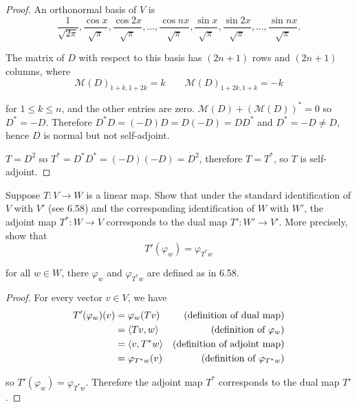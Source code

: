 \begin{proof}
    An orthonormal basis of $V$ is
    \[
        \frac{1}{\sqrt{2\pi}}, \frac{\cos x}{\sqrt{\pi}}, \frac{\cos 2x}{\sqrt{\pi}}, \ldots, \frac{\cos nx}{\sqrt{\pi}}, \frac{\sin x}{\sqrt{\pi}}, \frac{\sin 2x}{\sqrt{\pi}}, \ldots, \frac{\sin nx}{\sqrt{\pi}}.
    \]

    The matrix of $D$ with respect to this basis has $(2n+1)$ rows and $(2n+1)$ columns, where
    \[
        {\mathcal{M}(D)}_{1+k, 1+2k} = k\qquad {\mathcal{M}(D)}_{1+2k, 1+k} = -k
    \]

    for $1\leq k\leq n$, and the other entries are zero. $\mathcal{M}(D) + {(\mathcal{M}(D))}^{*} = 0$ so $D^{*} = -D$. Therefore $D^{*}D = (-D)D = D(-D) = DD^{*}$ and $D^{*} = -D\ne D$, hence $D$ is normal but not self-adjoint.

    $T = D^{2}$ so $T^{*} = D^{*}D^{*} = (-D)(-D) = D^{2}$, therefore $T = T^{*}$, so $T$ is self-adjoint.
\end{proof}
\newpage

\begin{exercise}
    Suppose $T: V \to W$ is a linear map. Show that under the standard identification of $V$ with $V'$ (see 6.58) and the corresponding identification of $W$ with $W'$, the adjoint map $T^{*}: W\to V$ corresponds to the dual map $T': W'\to V'$. More precisely, show that
    \[
        T'(\varphi_{w}) = \varphi_{T^{*}w}
    \]

    for all $w\in W$, there $\varphi_{w}$ and $\varphi_{T^{*}w}$ are defined as in 6.58.
\end{exercise}

\begin{proof}
    For every vector $v\in V$, we have
    \begin{align*}
        T'(\varphi_{w})(v) & = \varphi_{w}(Tv)       & \text{(definition of dual map)}           \\
                           & = \left\langle{Tv, w}\right\rangle     & \text{(definition of $\varphi_{w}$)}      \\
                           & = \left\langle{v, T^{*}w}\right\rangle & \text{(definition of adjoint map)}        \\
                           & = \varphi_{T^{*}w}(v)   & \text{(definition of $\varphi_{T^{*}w}$)}
    \end{align*}

    so $T'(\varphi_{w}) = \varphi_{T^{*}w}$. Therefore the adjoint map $T^{*}$ corresponds to the dual map $T'$.
\end{proof}
\newpage

